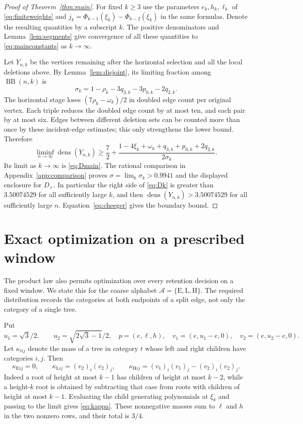 \documentclass[11pt,a4paper]{article}
\theoremstyle{definition}
\theoremstyle{remark}
\newcommand{\dens}{\operatorname{dens}}
\newcommand{\BB}{\operatorname{BB}}
\newcommand{\E}{\mathrm E}
\newcommand{\HH}{\mathrm H}
\newcommand{\LL}{\mathrm L}
\begin{document}
\begin{proof}[Proof of Theorem~\ref{thm:main}]
For fixed $k\ge3$ use the parameters $e_k,h_k,\ell_k$ of \eqref{eq:finiteweights} and
$j_k=\Phi_{k-1}(\xi_k)-\Phi_{k-2}(\xi_k)$ in the same formulas. Denote the resulting quantities by a subscript $k$. The positive denominators and Lemma~\ref{lem:segments} give convergence of all these quantities to \eqref{eq:mainconstants} as $k\to\infty$.

Let $Y_{n,k}$ be the vertices remaining after the horizontal selection and all the local deletions above. By Lemma~\ref{lem:disjoint}, its limiting fraction among $\BB(n,k)$ is
\[
\sigma_k=1-\rho_k-3q_{3,k}-3p_{0,k}-2q_{2,k}.
\]
The horizontal stage loses $(7\rho_k-\omega_k)/2$ in doubled edge count per original vertex. Each triple reduces the doubled edge count by at most ten, and each pair by at most six. Edges between different deletion sets can be counted more than once by these incident-edge estimates; this only strengthens the lower bound. Therefore
\begin{equation}\label{eq:Dk}
\liminf_{n\to\infty}\dens(Y_{n,k})\ge
\frac72+\frac{1-4\xi_k+\omega_k+q_{3,k}+p_{0,k}+2q_{2,k}}{2\sigma_k}.
\end{equation}
Its limit as $k\to\infty$ is \eqref{eq:Dmain}. The rational comparison in Appendix~\ref{app:comparison} proves $\sigma=\lim_k\sigma_k>0.9941$ and the displayed enclosure for $D_+$. In particular the right side of \eqref{eq:Dk} is greater than $3.50074529$ for all sufficiently large $k$, and then $\dens(Y_{n,k})>3.50074529$ for all sufficiently large $n$. Equation~\eqref{eq:cheeger} gives the boundary bound.
\end{proof}

\section{Exact optimization on a prescribed window}\label{sec:windows}
The product law also permits optimization over every retention decision on a fixed window. We state this for the coarse alphabet $\mathcal A=\{\E,\LL,\HH\}$. The required distribution records the categories at both endpoints of a split edge, not only the category of a single tree.

Put
\[
u_1=\sqrt3/2,\qquad u_2=\sqrt{2\sqrt3-1}/2,
\quad p=(e,\ell,h),\quad v_1=(e,u_1-e,0),\quad v_2=(e,u_2-e,0).
\]
Let $\kappa_{tij}$ denote the mass of a tree in category $t$ whose left and right children have categories $i,j$. Then
\begin{equation}\label{eq:kappa}
\kappa_{\E ij}=0,\qquad
\kappa_{\LL ij}=(v_2)_i(v_2)_j,\qquad
\kappa_{\HH ij}=(v_1)_i(v_1)_j-(v_2)_i(v_2)_j.
\end{equation}
Indeed a root of height at most $k-1$ has children of height at most $k-2$, while a height-$k$ root is obtained by subtracting that case from roots with children of height at most $k-1$. Evaluating the child generating polynomials at $\xi_k$ and passing to the limit gives \eqref{eq:kappa}. These nonnegative masses sum to $\ell$ and $h$ in the two nonzero rows, and their total is $3/4$.
\end{document}
